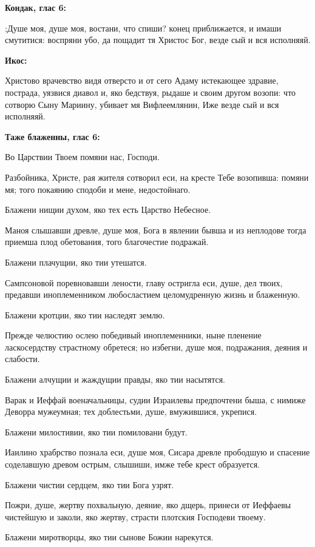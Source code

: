 \medskip\bfseries Кондак, глас 6:\normalfont{}


;Душе моя, душе моя, востани, что спиши? конец приближается, и имаши смутитися: воспряни убо, да пощадит тя Христос Бог, везде сый и вся исполняяй. 


\medskip
\bfseries Икос:\normalfont{}


Христово врачевство видя отверсто и от сего Адаму истекающее здравие, пострада, уязвися диавол и, яко бедствуя, рыдаше и своим другом возопи: что сотворю Сыну Мариину, убивает мя Вифлеемлянин, Иже везде сый и вся исполняяй. 

\medskip\bfseries Таже блаженны, глас 6:\normalfont{}


Во Царствии Твоем помяни нас, Господи.


Разбойника, Христе, рая жителя сотворил еси, на кресте Тебе возопивша: помяни мя; того покаянию сподоби и мене, недостойнаго.


Блажени нищии духом, яко тех есть Царство Небесное.


Маноя слышавши древле, душе моя, Бога в явлении бывша и из неплодове тогда приемша плод обетования, того благочестие подражай.


Блажени плачущии, яко тии утешатся.


Сампсоновой поревновавши лености, главу остригла еси, душе, дел твоих, предавши иноплеменником любосластием целомудренную жизнь и блаженную.


Блажени кротции, яко тии наследят землю.


Прежде челюстию ослею победивый иноплеменники, ныне пленение ласкосердству страстному обретеся; но избегни, душе моя, подражания, деяния и слабости.


Блажени алчущии и жаждущии правды, яко тии насытятся.


Варак и Иеффай военачальницы, судии Израилевы предпочтени быша, с нимиже Деворра мужеумная; тех доблестьми, душе, вмужившися, укрепися.


Блажени милостивии, яко тии помиловани будут.


Иаилино храбрство познала еси, душе моя, Сисара древле прободшую и спасение соделавшую древом острым, слышиши, имже тебе крест образуется.


Блажени чистии сердцем, яко тии Бога узрят.


Пожри, душе, жертву похвальную, деяние, яко дщерь, принеси от Иеффаевы чистейшую и заколи, яко жертву, страсти плотския Господеви твоему.


Блажени миротворцы, яко тии сынове Божии нарекутся.


